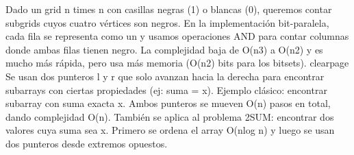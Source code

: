 {}\markdownRendererInterblockSeparator
{}
\markdownRendererSectionEnd \markdownRendererSectionBegin
{}\markdownRendererInterblockSeparator
{}Dado un grid \markdownRendererDollarSign{}n \markdownRendererBackslash{}times n\markdownRendererDollarSign{} con casillas negras (1) o blancas (0), queremos contar subgrids cuyos cuatro vértices son negros.\markdownRendererParagraphSeparator
{}En la implementación bit-paralela, cada fila se representa como un  y usamos operaciones AND para contar columnas donde ambas filas tienen negro. La complejidad baja de O(\markdownRendererDollarSign{}n\markdownRendererCircumflex{}3\markdownRendererDollarSign{}) a O(\markdownRendererDollarSign{}n\markdownRendererCircumflex{}2\markdownRendererDollarSign{}) y es mucho más rápida, pero usa más memoria (\markdownRendererDollarSign{}O(n\markdownRendererCircumflex{}2)\markdownRendererDollarSign{} bits para los bitsets).\markdownRendererInterblockSeparator
{}\markdownRendererInterblockSeparator
{}\markdownRendererDollarSign{}\markdownRendererBackslash{}clearpage\markdownRendererDollarSign{}\markdownRendererInterblockSeparator
{}
\markdownRendererSectionEnd \markdownRendererSectionBegin
{}\markdownRendererInterblockSeparator
{}Se usan dos punteros \markdownRendererDollarSign{}l\markdownRendererDollarSign{} y \markdownRendererDollarSign{}r\markdownRendererDollarSign{} que solo avanzan hacia la derecha para encontrar subarrays con ciertas propiedades (ej: suma = x).\markdownRendererParagraphSeparator
{}Ejemplo clásico: encontrar subarray con suma exacta x. Ambos punteros se mueven O(\markdownRendererDollarSign{}n\markdownRendererDollarSign{}) pasos en total, dando complejidad O(\markdownRendererDollarSign{}n\markdownRendererDollarSign{}).\markdownRendererParagraphSeparator
{}También se aplica al problema 2SUM: encontrar dos valores cuya suma sea x. Primero se ordena el array O(\markdownRendererDollarSign{}n\markdownRendererBackslash{}log n\markdownRendererDollarSign{}) y luego se usan dos punteros desde extremos opuestos.\markdownRendererInterblockSeparator
{}\markdownRendererInterblockSeparator
{}
\markdownRendererSectionEnd \markdownRendererSectionBegin
{}\markdownRendererInterblockSeparator
